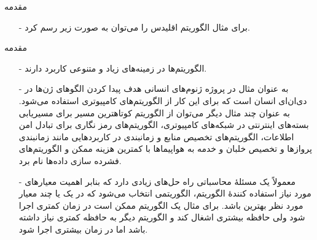 \begin{frame}{مقدمه}
\begin{itemize}\itemr
\item[-]
برای مثال الگوریتم اقلیدس را می‌توان به صورت زیر رسم کرد.
\begin{figure}[h]

\end{figure}
\end{itemize}
\end{frame}

\iffalse
\begin{frame}{مقدمه}
\begin{itemize}\itemr
\item[-]
در الگوریتم‌ها معمولا از علامت
\m{\leftarrow}
یا
\m{:=}
برای عملیات انتساب استفاده می‌شود. برای مثال
\m{m \leftarrow n}
یعنی
\m{m}
را با مقدار فعلی
\m{n}
مقدار دهی می‌کنیم.
\item[-]
به عنوان مثال دیگر، برای افزایش مقدار یک متغیر به اندازهٔ یک واحد می‌نویسیم
\m{n \leftarrow n+1}
یعنی مقدار
\m{n}
برابراست با مقدار فعلی
\m{n}
به علاوهٔ یک. معمولاً این عبارت را به این صورت می‌خوانیم : مقدار
\m{n}
برابر می‌شود با
\m{n+1}
.
\item[-]
معمولاً از علامت
\m{==}
یا
\m{=}
برای تساوی استفاده می‌شود. برای مثال می‌توانیم بپرسیم آیا مقدار
\m{m}
برابراست با مقدار
\m{n}
و برای مثال می‌نویسیم اگر
\m{m == n}
به مرحله بعد می‌رویم.
\item[-]
در نشانه گذاری ریاضی معمولاً دنباله‌ها را با استفاده از اندیس‌ها نمایش می‌دهیم برای مثال دنباله
\m{v_1, v_2, \cdots , v_n}
یک دنباله از
n
متغیر است. در الگوریتم‌ها معمولاً از عملگر زیرنویس
\fn{1}{subscript}
که با دو براکت باز و بسته
\m{[~]}
نمایش داده می‌شود استفاده می‌کنیم. بنابراین
i
امین عنصر دنبالهٔ
\m{v_1, \cdots , v_n}
را به صورت
\m{v[i]}
نمایش می‌دهیم.
\end{itemize}
\end{frame}
\fi


\begin{frame}{مقدمه}
\begin{itemize}\itemr
\item[-]
الگوریتم‌ها در زمینه‌های زیاد و متنوعی کاربرد دارند.
\item[-]
به عنوان مثال در پروژه ژنوم‌های انسانی هدف پیدا کردن الگوهای ژن‌ها در دی‌ان‌ای
 انسان است که برای این کار از الگوریتم‌های کامپیوتری استفاده می‌شود. به عنوان چند مثال دیگر می‌توان از الگوریتم کوتاهترین مسیر برای مسیریابی بسته‌های اینترنتی در شبکه‌های کامپیوتری، الگوریتم‌های رمز نگاری برای تبادل امن اطلاعات، الگوریتم‌های تخصیص منابع و زمانبندی در کاربردهایی مانند زمانبندی پروازها و تخصیص خلبان و خدمه به هواپیماها با کمترین هزینه ممکن و الگوریتم‌های فشرده سازی داده‌ها نام برد.
\item[-]
معمولاً یک مسئلهٔ محاسباتی راه حل‌های زیادی دارد که بنابر اهمیت معیارهای مورد نیاز استفاده کنندهٔ الگوریتم، الگوریتمی انتخاب می‌شود که در یک یا چند معیار مورد نظر بهترین باشد. برای مثال یک الگوریتم ممکن است در زمان کمتری اجرا شود ولی حافظه بیشتری اشغال کند و الگوریتم دیگر به حافظه کمتری نیاز داشته باشد اما در زمان بیشتری اجرا شود.
\end{itemize}
\end{frame}


